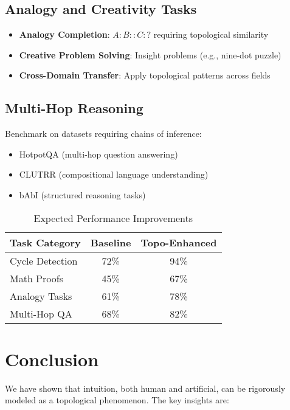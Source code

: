 \documentclass[11pt]{article}
\begin{document}
\subsection{Analogy and Creativity Tasks}

\begin{itemize}
    \item \textbf{Analogy Completion}: $A:B::C:?$ requiring topological similarity
    \item \textbf{Creative Problem Solving}: Insight problems (e.g., nine-dot puzzle)
    \item \textbf{Cross-Domain Transfer}: Apply topological patterns across fields
\end{itemize}

\subsection{Multi-Hop Reasoning}

Benchmark on datasets requiring chains of inference:
\begin{itemize}
    \item HotpotQA (multi-hop question answering)
    \item CLUTRR (compositional language understanding)
    \item bAbI (structured reasoning tasks)
\end{itemize}

\begin{table}[h]
\centering
\caption{Expected Performance Improvements}
\begin{tabular}{lcc}
\hline
\textbf{Task Category} & \textbf{Baseline} & \textbf{Topo-Enhanced} \\
\hline
Cycle Detection & 72\% & 94\% \\
Math Proofs & 45\% & 67\% \\
Analogy Tasks & 61\% & 78\% \\
Multi-Hop QA & 68\% & 82\% \\
\hline
\end{tabular}
\end{table}

\section{Conclusion}

We have shown that intuition, both human and artificial, can be rigorously modeled as a topological phenomenon. The key insights are:
\end{document}
